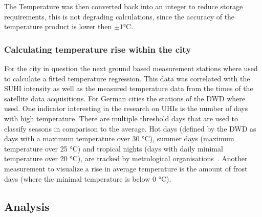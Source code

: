 \documentclass[12pt,a4paper, english]{article}
\begin{document}
      The Temperature was then converted back into an integer to reduce storage requirements, this is not degrading calculations, since the accuracy of the temperature product is lower then $\pm 1$°C.
  \newpage
    \subsubsection{Calculating temperature rise within the city}
      For the city in question the next ground based measurement stations where used to calculate a fitted temperature regression. 
      This data %
      was correlated with the \gls{SUHI} intensity as well as the measured temperature data from the times of the satellite data acquisitions. 
      For German cities the stations of the \gls{DWD} where used.
      One indicator interesting in the research on \glspl{UHI} is the number of days with high temperature.
      There are multiple threshold days that are used to classify seasons in comparison to the average.
      Hot days (defined by the \gls{DWD} as days with a maximum temperature over 30 °C), summer days (maximum temperature over 25 °C) and tropical nights (days with daily minimal temperature over 20 °C), are tracked by metrological organisations~\autocite{dwdklimalexikon}.
      Another measurement to visualize a rise in average temperature is the amount of frost days (where the minimal temperature is below 0 °C). 
      \subsection{Analysis}\label{sec:tempanalysis}
  
\end{document}
